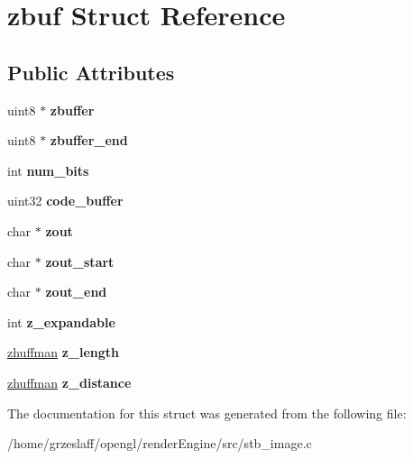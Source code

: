 \hypertarget{structzbuf}{\section{zbuf Struct Reference}
\label{structzbuf}
}
\subsection*{Public Attributes}
\begin{DoxyCompactItemize}
\item 
\hypertarget{structzbuf_a7080eb91dcc67e1dfe818d08e6f22c4e}{uint8 $\ast$ {\bfseries zbuffer}}\label{structzbuf_a7080eb91dcc67e1dfe818d08e6f22c4e}

\item 
\hypertarget{structzbuf_af030baa17bebedd18272678da17a33f4}{uint8 $\ast$ {\bfseries zbuffer\-\_\-end}}\label{structzbuf_af030baa17bebedd18272678da17a33f4}

\item 
\hypertarget{structzbuf_acd069cdb4100884a732ad2794edbbdff}{int {\bfseries num\-\_\-bits}}\label{structzbuf_acd069cdb4100884a732ad2794edbbdff}

\item 
\hypertarget{structzbuf_a3bb8244d7be17801079c5a8587182edb}{uint32 {\bfseries code\-\_\-buffer}}\label{structzbuf_a3bb8244d7be17801079c5a8587182edb}

\item 
\hypertarget{structzbuf_aaf137c25fa5b9fb14e92354da4203c38}{char $\ast$ {\bfseries zout}}\label{structzbuf_aaf137c25fa5b9fb14e92354da4203c38}

\item 
\hypertarget{structzbuf_af31571e8d74c78c9bb18d92205150b28}{char $\ast$ {\bfseries zout\-\_\-start}}\label{structzbuf_af31571e8d74c78c9bb18d92205150b28}

\item 
\hypertarget{structzbuf_af07c0b7b7227f670ee1413bc0dcab791}{char $\ast$ {\bfseries zout\-\_\-end}}\label{structzbuf_af07c0b7b7227f670ee1413bc0dcab791}

\item 
\hypertarget{structzbuf_ae662f24e0973ca19b543e64647a6bfb6}{int {\bfseries z\-\_\-expandable}}\label{structzbuf_ae662f24e0973ca19b543e64647a6bfb6}

\item 
\hypertarget{structzbuf_a5906bdbe9dfb565339acac51af9efe89}{\hyperlink{structzhuffman}{zhuffman} {\bfseries z\-\_\-length}}\label{structzbuf_a5906bdbe9dfb565339acac51af9efe89}

\item 
\hypertarget{structzbuf_ae7d9588b2548708e14f3c6ad89bf26b5}{\hyperlink{structzhuffman}{zhuffman} {\bfseries z\-\_\-distance}}\label{structzbuf_ae7d9588b2548708e14f3c6ad89bf26b5}

\end{DoxyCompactItemize}


The documentation for this struct was generated from the following file\-:\begin{DoxyCompactItemize}
\item 
/home/grzeslaff/opengl/render\-Engine/src/stb\-\_\-image.\-c\end{DoxyCompactItemize}
